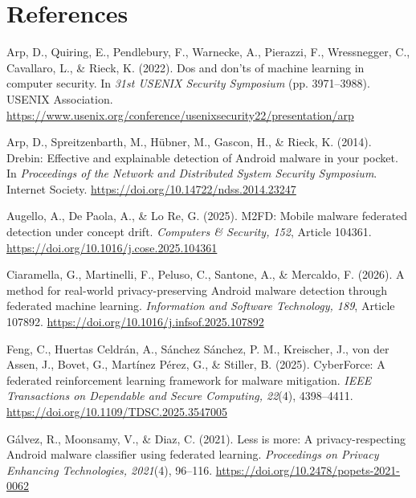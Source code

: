 \documentclass[12pt,letterpaper]{article}
\newenvironment{references}{\begin{list}{}{\setlength{\leftmargin}{0.5in}\setlength{\itemindent}{-0.5in}\setlength{\itemsep}{0pt}\setlength{\parsep}{0pt}\setlength{\topsep}{0pt}}\raggedright}{\end{list}}
\begin{document}
\section*{References}
\begin{references}

\item Arp, D., Quiring, E., Pendlebury, F., Warnecke, A., Pierazzi, F., Wressnegger, C., Cavallaro, L., \& Rieck, K. (2022). Dos and don'ts of machine learning in computer security. In \textit{31st USENIX Security Symposium} (pp. 3971–3988). USENIX Association. \url{https://www.usenix.org/conference/usenixsecurity22/presentation/arp}

\item Arp, D., Spreitzenbarth, M., Hübner, M., Gascon, H., \& Rieck, K. (2014). Drebin: Effective and explainable detection of Android malware in your pocket. In \textit{Proceedings of the Network and Distributed System Security Symposium}. Internet Society. \url{https://doi.org/10.14722/ndss.2014.23247}

\item Augello, A., De Paola, A., \& Lo Re, G. (2025). M2FD: Mobile malware federated detection under concept drift. \textit{Computers \& Security, 152}, Article 104361. \url{https://doi.org/10.1016/j.cose.2025.104361}

\item Ciaramella, G., Martinelli, F., Peluso, C., Santone, A., \& Mercaldo, F. (2026). A method for real-world privacy-preserving Android malware detection through federated machine learning. \textit{Information and Software Technology, 189}, Article 107892. \url{https://doi.org/10.1016/j.infsof.2025.107892}

\item Feng, C., Huertas Celdrán, A., Sánchez Sánchez, P. M., Kreischer, J., von der Assen, J., Bovet, G., Martínez Pérez, G., \& Stiller, B. (2025). CyberForce: A federated reinforcement learning framework for malware mitigation. \textit{IEEE Transactions on Dependable and Secure Computing, 22}(4), 4398–4411. \url{https://doi.org/10.1109/TDSC.2025.3547005}

\item Gálvez, R., Moonsamy, V., \& Diaz, C. (2021). Less is more: A privacy-respecting Android malware classifier using federated learning. \textit{Proceedings on Privacy Enhancing Technologies, 2021}(4), 96–116. \url{https://doi.org/10.2478/popets-2021-0062}


\end{references}
\end{document}
